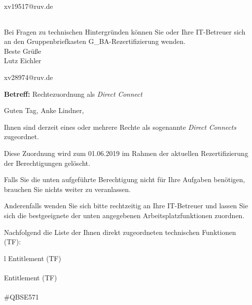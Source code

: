 \documentclass[a4paper,landscape,12pt]{letter}
\begin{document}
\begin{letter}{xv19517@ruv.de\hfill \break}
\begin{tiny}
\begin{longtable}{|p{35mm}|p{15mm}|p{25mm}|p{10mm}|p{40mm}|p{50mm}|p{50mm}|}
\hline
		\end{longtable}
		\end{tiny}
	
\begin{minipage}{\textwidth}
			Bei Fragen zu technischen Hintergründen können Sie 
			oder Ihre IT-Betreuer sich an den Gruppenbriefkasten 
			G\_BA-Rezertifizierung
			wenden.\\
			\linebreak
			Beste Grüße\\
			Lutz Eichler
	\end{minipage}
	\end{letter}
	
\begin{letter}{xv28974@ruv.de\hfill \break}
\begin{normalsize}
	\opening{\textbf{Betreff:} Rechtezuordnung als \emph{Direct Connect}}
	\begin{normalsize} \hfill
	\end{normalsize}

	\begin{normalsize}
		Guten Tag, 
	Anke Lindner, \hfill \break
	\end{normalsize}
	\end{normalsize}
	
\begin{normalsize}
	Ihnen sind derzeit eines oder mehrere Rechte als sogenannte \emph{Direct Connects} zugeordnet.
	
	Diese Zuordnung wird zum 01.06.2019 im Rahmen der aktuellen Rezertifizierung der Berechtigungen gelöscht.
	
	Falls Sie die unten aufgeführte Berechtigung nicht für Ihre Aufgaben benötigen, 
	brauchen Sie nichts weiter zu veranlassen.
	
	Anderenfalls wenden Sie sich bitte rechtzeitig an Ihre IT-Betreuer 
	und lassen Sie sich die bestgeeignete der unten angegebenen Arbeitsplatzfunktionen zuordnen.
	\end{normalsize}
	
\begin{normalsize}
	Nachfolgend die Liste der Ihnen direkt zugeordneten technischen Funktionen (TF):

	\begin{longtable}{l}
		Entitlement (TF) \\ \hline
		\endfirsthead
		\\\hline
		Entitlement (TF) \\ \hline
		\endhead %
		\multicolumn{1}{r@{}}{Fortsetzung \ldots}\\
		\endfoot
		\hline
		\endlastfoot
	\#QBSE571\\
	\end{longtable}
	\end{normalsize}
	

\end{letter}
\end{document}
